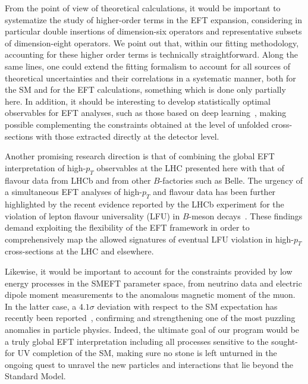 From the point of view of theoretical calculations, it would be important to systematize the study
of higher-order terms in the EFT expansion, considering in particular double insertions
of dimension-six operators and representative subsets of dimension-eight operators.
%
We point out that, within our fitting methodology, accounting for these higher order terms
is technically straightforward.
%
Along the same lines, one could extend the fitting formalism to account
for all sources of theoretical uncertainties and their correlations in a systematic
manner, both for the SM and for the EFT calculations, something which is done
only partially here.
%
In addition, it should be interesting to develop statistically optimal observables
for EFT analyses, such as those based on deep
learning~\cite{Brehmer:2018kdj,DAgnolo:2018cun,Chen:2020mev},
making possible complementing
 the constraints obtained at the level of unfolded
 cross-sections with those extracted directly at the detector level.

Another promising research direction is that of combining
the global EFT interpretation of high-$p_T$ observables
at the LHC presented here with that of flavour data from LHCb and from other $B$-factories
such as Belle.
%
The urgency of a simultaneous EFT analyses of high-$p_T$ and flavour data
has been further highlighted by the recent evidence reported by the LHCb
experiment for the violation
of lepton flavour universality (LFU) in $B$-meson decays~\cite{Aaij:2021vac}.
%
These findings demand exploiting the flexibility of the EFT framework
in order to  comprehensively map the allowed signatures of eventual LFU violation
in  high-$p_T$ cross-sections at the LHC and elsewhere.

Likewise, it would be important to account for the constraints
provided by low energy processes in the SMEFT parameter space,
from neutrino data and electric dipole moment measurements
to the anomalous magnetic moment of the muon.
%
In the latter case, a $4.1\sigma$ deviation
with respect to the SM expectation has recently been reported~\cite{Abi:2021gix},
confirming and strengthening one of the most puzzling anomalies in particle
physics.
%
Indeed, the ultimate goal of our program would be a truly global EFT interpretation
including all processes sensitive to the sought-for UV completion of the SM,
making sure no stone is left unturned in the ongoing quest to unravel the new particles
and interactions that lie beyond the Standard Model.

